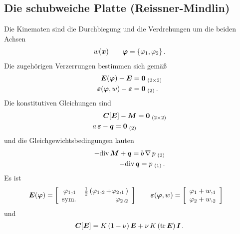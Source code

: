 \textcolor{sectionTitleBlue}{\section{Die schubweiche Platte (Reissner-Mindlin)}}
Die Kinematen sind die Durchbiegung und die Verdrehungen um die beiden Achsen
\begin{align}
w(\mbox{\boldmath $x$}) \qquad \mbox{\boldmath $\varphi$} = \{\varphi_1,\varphi_2\}\,.
\end{align}
Die zugeh\"{o}rigen Verzerrungen bestimmen sich gem\"{a}{\ss}
\begin{subequations}
\begin{align}
\mbox{\boldmath $E$}(\mbox{\boldmath $\varphi$}) - \mbox{\boldmath $E$} &= \mbox{\boldmath $0$}_{\,\,(2 \times 2)} \\
\mbox{\boldmath $\varepsilon$}(\mbox{\boldmath $\varphi$} ,w) - \mbox{\boldmath $\varepsilon$} &= \mbox{\boldmath $0$}_{\,\,(2)}\,.
\end{align}
\end{subequations}
Die konstitutiven Gleichungen sind
\begin{subequations}
\begin{align}
\mbox{\boldmath $C$}[\mbox{\boldmath $E$}] - \mbox{\boldmath $M$} &= \mbox{\boldmath $0$}_{\,\,(2 \times 2)}  \\
a\,\mbox{\boldmath $\varepsilon$} - \mbox{\boldmath $q$} = \mbox{\boldmath $0$}_{\,\,(2)}
\end{align}
\end{subequations}
und die Gleichgewichtsbedingungen lauten
\begin{subequations}
\begin{align}
- \text{div}\,\mbox{\boldmath $M$} + \mbox{\boldmath $q$} = b\,\nabla\,p_{\,\,(2)} \\
- \text{div}\,\mbox{\boldmath $q$} = p_{\,\,(1)}\,.
\end{align}
\end{subequations}
Es ist
\begin{align}
\vek E(\vek \varphi ) &= \left[ \barr {r @{\hspace{4mm}}r  }
      \varphi_1,_1 & \frac{1}{2}\,(\varphi_1,_2 + \varphi_2,_1) \\
      \text{sym.} & \varphi_2,_2 \\
     \earr \right] \qquad \vek \varepsilon(\vek \varphi ,w) = \left[ \barr {r }
      \varphi_1 + w,_1 \\
      \varphi_2 + w,_2
     \earr \right]
\end{align}
und
\begin{align}
 \mbox{\boldmath $C$}[\mbox{\boldmath $E$}] = K\,(1 - \nu)\,\mbox{\boldmath $E$} + \nu\,K\,(\text{tr}\,\mbox{\boldmath $E$})\,\mbox{\boldmath $I$}\,.
\end{align}

